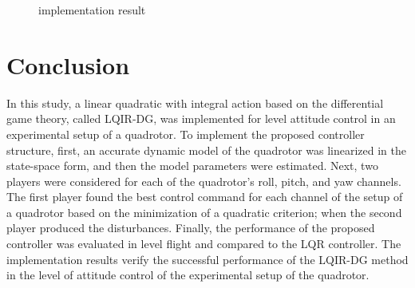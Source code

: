 \documentclass[conference]{IEEEtran}
\begin{document}
\begin{figure}[!h]
{	}
	\hfil
	\caption{implementation result}
\end{figure}

\section{Conclusion}
In this study, a linear quadratic with integral action based on the differential game theory, called LQIR-DG, was implemented for level attitude control in an experimental setup of a quadrotor. To implement the proposed controller structure, first, an accurate dynamic model of the quadrotor was linearized in the state-space form, and then the model parameters were estimated. Next, two players were considered for each of the quadrotor's roll, pitch, and yaw channels. The first player found the best control command for each channel of the setup of a quadrotor based on the minimization of a quadratic criterion; when the second player produced the disturbances. Finally, the performance of the proposed controller was evaluated in level flight and compared to the LQR controller. The implementation results verify the successful performance of the LQIR-DG method in the level of attitude control of the experimental setup of the quadrotor.
\end{document}
